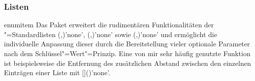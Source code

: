 \subsubsection{Listen}
%
%
\begin{packages}
\item[enumitem]
  Das Paket  erweitert die rudimentären Funktionalitäten der 
  "=Standardlisten
  (,)'none',
  (,)'none' sowie
  (,)'none' und
  ermöglicht die individuelle Anpassung dieser durch die Bereitstellung vieler 
  optionale Parameter nach dem Schlüssel"=Wert"=Prinzip. Eine von mir sehr 
  häufig genutzte Funktion ist beispielsweise die Entfernung des zusätzlichen 
  Abstand zwischen den einzelnen Einträgen einer Liste mit 
  []()'none'.
%
\end{packages}


